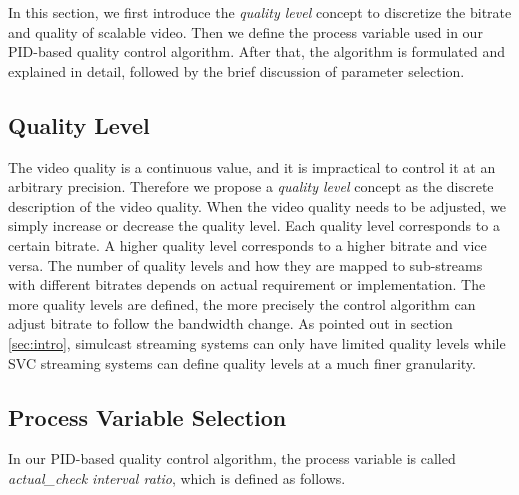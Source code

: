 \documentclass[journal]{IEEEtran}
\begin{document}
In this section, we first introduce the \textit{quality level} concept to discretize the bitrate and quality of scalable video. Then we define the process variable used in our PID-based quality control algorithm. After that, the algorithm is formulated and explained in detail, followed by the brief discussion of parameter selection.

\subsection{Quality Level}
\label{subsec:quality-level}

The video quality is a continuous value, and it is impractical to control it at an arbitrary precision. Therefore we propose a \textit{quality level} concept as the discrete description of the video quality. When the video quality needs to be adjusted, we simply increase or decrease the quality level. Each quality level corresponds to a certain bitrate. A higher quality level corresponds to a higher bitrate and vice versa. The number of quality levels and how they are mapped to sub-streams with different bitrates depends on actual requirement or implementation. The more quality levels are defined, the more precisely the control algorithm can adjust bitrate to follow the bandwidth change. As pointed out in section \ref{sec:intro}, simulcast streaming systems can only have limited quality levels while SVC streaming systems can define quality levels at a much finer granularity.

\subsection{Process Variable Selection}
\label{subsec:process-variable}

In our PID-based quality control algorithm, the process variable is called \textit{actual\_check interval ratio}, which is defined as follows.
\end{document}
